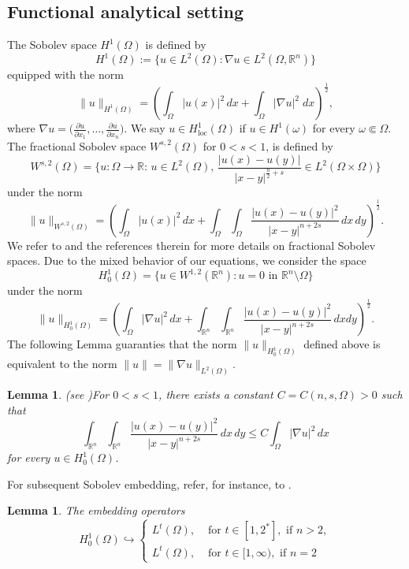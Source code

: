 \documentclass[11pt, notitlepage]{article}
\def\R{\mathbb{R}}
\newtheorem{Lemma}[Theorem]{Lemma}
\begin{document}
{\subsection{Functional analytical setting}
The Sobolev space $H^{1}(\Omega)$ is defined by
$$H^{1}(\Omega):=\{ u\in L^2(\Omega): \nabla u\in L^2(\Omega,\R^n) \}$$
equipped with the norm
$$
\|u\|_{H^{1}(\Omega)}=\left(\int_{\Omega}|u(x)|^2\,dx+\int_{\Omega}|\nabla u|^2\;dx\right)^\frac{1}{2},
$$
where $\nabla u=\Big(\frac{\partial u}{\partial x_1},\ldots,\frac{\partial u}{\partial x_n}\Big)$. We say $u\in H^1_{\mathrm{loc}}(\Omega)$ if $u\in H^1(\omega)$ for every $\omega\Subset\Omega$. The fractional Sobolev space $W^{s,2}(\Omega)$ for $0<s<1$, is defined by
$$
W^{s,2}(\Omega)=\Bigg\{{u:\Omega\to\mathbb{R}:\,}u\in L^2(\Omega),\,\frac{|u(x)-u(y)|}{|x-y|^{\frac{n}{2}+s}}\in L^2(\Omega\times \Omega)\Bigg\}
$$
under the norm
$$
\|u\|_{W^{s,2}(\Omega)}=\left(\int_{\Omega}|u(x)|^2\,dx+\int_{\Omega}\int_{\Omega}\frac{|u(x)-u(y)|^2}{|x-y|^{n+2s}}\,dx\,dy\right)^\frac{1}{2}.
$$
We refer to \cite{Hitchhikersguide} and the references therein for more details on fractional Sobolev spaces. Due to the mixed behavior of our equations, we consider the space
$$
H_0^{1}(\Omega)=\{u\in W^{1,2}(\mathbb{R}^n):u=0\text{ in }\mathbb{R}^n\setminus\Omega\}
$$
under the norm
$$
\|u\|_{H_0^{1}(\Omega)}=\left(\int_{\Omega}|\nabla u|^2\,dx+\int_{\mathbb{R}^{n}}\int_{\mathbb{R}^{n}}\frac{|u(x)-u(y)|^2}{|x-y|^{n+2s}}\, dx dy\right)^\frac{1}{2}.
$$
{The following Lemma guaranties that the norm $\|u\|_{H_0^{1}(\Omega)}$ defined above is equivalent to the norm $\|u\|=\|\nabla u\|_{L^2(\Omega)}$.}
\begin{Lemma}(see \cite[Lemma $2.1$]{Silva})\label{Gagliardo}
For $0<s<1$, there exists a constant $C=C(n,s,\Omega)>0$ such that
\begin{equation}\label{locnonsem}
\int_{\mathbb{R}^n}\int_{\mathbb{R}^n}\frac{|u(x)-u(y)|^2}{|x-y|^{n+2s}}\,dx\,dy\leq C\int_{\Omega}|\nabla u|^2\,dx
\end{equation}
for every $u\in H_0^{1}(\Omega)$.
\end{Lemma}
For subsequent Sobolev embedding, refer, for instance, to \cite{Evans}.
\begin{Lemma}\label{emb}
The embedding operators
\[
H_0^{1}(\Omega)\hookrightarrow
\begin{cases}
L^t(\Omega),&\text{ for }t\in[1,2^{*}],\text{ if }n>2,\\
L^t(\Omega),&\text{ for }t\in[1,\infty),\text{ if }n=2
\end{cases}
\]
\end{Lemma}}
\end{document}
